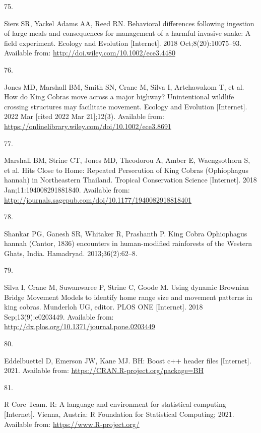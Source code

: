 \documentclass[10pt,a4paper]{article}
\newlength{\cslhangindent}
\newlength{\csllabelwidth}
\newlength{\cslentryspacingunit} %
\newenvironment{CSLReferences}[2] %
 {%
  \setlength{\parindent}{0pt}
  \ifodd #1
  \let\oldpar\par
  \def\par{\hangindent=\cslhangindent\oldpar}
  \fi
  \setlength{\parskip}{#2\cslentryspacingunit}
 }%
 {}
\newcommand{\CSLLeftMargin}[1]{\parbox[t]{\csllabelwidth}{#1}}
\newcommand{\CSLRightInline}[1]{\parbox[t]{\linewidth - \csllabelwidth}{#1}\break}
\begin{document}
\begin{CSLReferences}{0}{0}
\leavevmode{}%
\CSLLeftMargin{75. }
\CSLRightInline{Siers SR, Yackel Adams AA, Reed RN. Behavioral differences following ingestion of large meals and consequences for management of a harmful invasive snake: {A} field experiment. Ecology and Evolution {[}Internet{]}. 2018 Oct;8(20):10075--93. Available from: \url{http://doi.wiley.com/10.1002/ece3.4480}}

\leavevmode{}%
\CSLLeftMargin{76. }
\CSLRightInline{Jones MD, Marshall BM, Smith SN, Crane M, Silva I, Artchawakom T, et al. How do {King} {Cobras} move across a major highway? {Unintentional} wildlife crossing structures may facilitate movement. Ecology and Evolution {[}Internet{]}. 2022 Mar {[}cited 2022 Mar 21{]};12(3). Available from: \url{https://onlinelibrary.wiley.com/doi/10.1002/ece3.8691}}

\leavevmode{}%
\CSLLeftMargin{77. }
\CSLRightInline{Marshall BM, Strine CT, Jones MD, Theodorou A, Amber E, Waengsothorn S, et al. Hits {Close} to {Home}: {Repeated} {Persecution} of {King} {Cobras} ({Ophiophagus} hannah) in {Northeastern} {Thailand}. Tropical Conservation Science {[}Internet{]}. 2018 Jan;11:194008291881840. Available from: \url{http://journals.sagepub.com/doi/10.1177/1940082918818401}}

\leavevmode{}%
\CSLLeftMargin{78. }
\CSLRightInline{Shankar PG, Ganesh SR, Whitaker R, Prashanth P. King {Cobra} {Ophiophagus} hannah ({Cantor}, 1836) encounters in human-modified rainforests of the {Western} {Ghats}, {India}. Hamadryad. 2013;36(2):62--8. }

\leavevmode{}%
\CSLLeftMargin{79. }
\CSLRightInline{Silva I, Crane M, Suwanwaree P, Strine C, Goode M. Using dynamic {Brownian} {Bridge} {Movement} {Models} to identify home range size and movement patterns in king cobras. Munderloh UG, editor. PLOS ONE {[}Internet{]}. 2018 Sep;13(9):e0203449. Available from: \url{http://dx.plos.org/10.1371/journal.pone.0203449}}

\leavevmode{}%
\CSLLeftMargin{80. }
\CSLRightInline{Eddelbuettel D, Emerson JW, Kane MJ. BH: Boost c++ header files {[}Internet{]}. 2021. Available from: \url{https://CRAN.R-project.org/package=BH}}

\leavevmode{}%
\CSLLeftMargin{81. }
\CSLRightInline{R Core Team. R: A language and environment for statistical computing {[}Internet{]}. Vienna, Austria: R Foundation for Statistical Computing; 2021. Available from: \url{https://www.R-project.org/}}


\end{CSLReferences}
\end{document}
